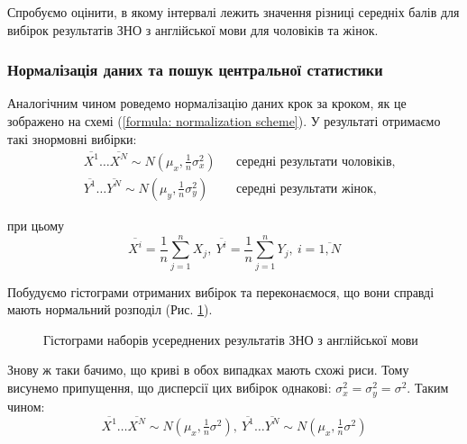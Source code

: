 Спробуємо оцінити, в якому інтервалі лежить значення різниці середніх балів для вибірок результатів ЗНО з 
англійської мови для чоловіків та жінок.

\subsubsection*{Нормалізація даних та пошук центральної статистики}

Аналогічним чином роведемо нормалізацію даних крок за кроком, як це зображено на схемі 
(\ref{formula: normalization scheme}). У результаті отримаємо такі знормовні вибірки:
\begin{align*}
    &\overline{X^1}\ldots \overline{X^N}\sim N(\mu_x,\tfrac{1}{n}\sigma_x^2) && \text{середні результати чоловіків,} \\
    &\overline{Y^1}\ldots \overline{Y^N}\sim N(\mu_y,\tfrac{1}{n}\sigma_y^2) && \text{середні результати жінок,}
\end{align*}

при цьому
\[ \overline{X^i}=\frac{1}{n}\sum\limits_{j=1}^nX_j,\ \overline{Y^i}=\frac{1}{n}\sum\limits_{j=1}^nY_j,\ i=\overline{1,N} \]

Побудуємо гістограми отриманих вибірок та переконаємося, що вони справді мають нормальний розподіл (Рис. 
\ref{fig:ENG means data}). 

\begin{figure}[H]
    \caption{Гістограми наборів усереднених результатів ЗНО з англійської мови}
    \label{fig:ENG means data}
\end{figure}

Знову ж таки бачимо, що криві в обох випадках мають схожі риси. Тому висунемо припущення, що дисперсії цих 
вибірок однакові: $\sigma_x^2=\sigma_y^2=\sigma^2$. Таким чином: 
\begin{equation*}
    \overline{X^1}\ldots \overline{X^N}\sim N(\mu_x,\tfrac{1}{n}\sigma^2),\ 
    \overline{Y^1}\ldots \overline{Y^N}\sim N(\mu_x,\tfrac{1}{n}\sigma^2)
\end{equation*}

